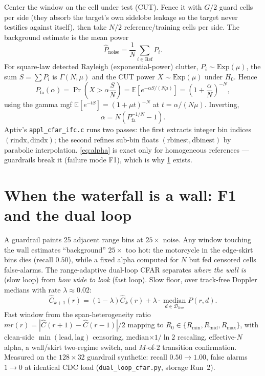 \documentclass[11pt,oneside]{book}
\begin{document}
Center the window on the cell under test (CUT). Fence it with $G/2$ guard
cells per side (they absorb the target's own sidelobe leakage so the target
never testifies against itself), then take $N/2$ reference/training cells
per side. The background estimate is the mean power
\begin{equation}
\hat{P}_{\mathrm{noise}} = \frac{1}{N}\sum_{i\in\mathrm{Ref}} P_i.
\label{eq:ca-est}
\end{equation}
For square-law detected Rayleigh (exponential-power) clutter, $P_i\sim
\mathrm{Exp}(\mu)$, the sum $S=\sum P_i$ is $\Gamma(N,\mu)$ and the CUT
power $X\sim\mathrm{Exp}(\mu)$ under $H_0$. Hence
\begin{equation}
P_{\mathrm{fa}}(\alpha)=\Pr\!\left(X>\alpha\frac{S}{N}\right)
= \mathbb{E}\!\left[e^{-\alpha S/(N\mu)}\right]
= \left(1+\frac{\alpha}{N}\right)^{-N},
\label{eq:pfa-deriv}
\end{equation}
using the gamma mgf $\mathbb{E}[e^{-tS}]=(1+\mu t)^{-N}$ at
$t=\alpha/(N\mu)$. Inverting,
\begin{equation}
\boxed{\alpha = N\left(P_{\mathrm{fa}}^{-1/N}-1\right).}
\label{eq:alpha}
\end{equation}
Aptiv's \texttt{appl\_cfar\_ifc.c} runs two passes: the first extracts
integer bin indices $(\mathrm{rindx},\mathrm{dindx})$; the second refines
sub-bin floats $(\mathrm{rbinest},\mathrm{dbinest})$ by parabolic
interpolation. \cref{eq:alpha} is exact only for homogeneous references ---
guardrails break it (failure mode F1), which is why \cref{sec:dual-loop}
exists.

\section{When the waterfall is a wall: F1 and the dual loop}
\label{sec:dual-loop}

A guardrail paints 25 adjacent range bins at $25\times$ noise. Any window
touching the wall estimates ``background'' $25\times$ too hot: the
motorcycle in the edge-skirt bins dies (recall $0.50$), while a fixed alpha
computed for $N$ but fed censored cells false-alarms. The range-adaptive
dual-loop CFAR separates \emph{where the wall is} (slow loop) from
\emph{how wide to look} (fast loop). Slow floor, over track-free Doppler
medians with rate $\lambda\approx0.02$:
\begin{equation}
\hat{C}_{k+1}(r)=(1-\lambda)\hat{C}_k(r)
+\lambda\cdot\operatorname*{median}_{d\in\mathcal{D}_{\mathrm{free}}}P(r,d).
\label{eq:slow-loop}
\end{equation}
Fast window from the span-heterogeneity ratio
$mr(r)=|\hat{C}(r+1)-\hat{C}(r-1)|/2$ mapping to
$R_0\in\{R_{\min},R_{\mathrm{mid}},R_{\max}\}$, with clean-side
$\min(\mathrm{lead},\mathrm{lag})$ censoring, median$\times1/\ln2$ rescaling,
effective-$N$ alpha, a wall/skirt two-regime switch, and $M$-of-$2$
transition confirmation. Measured on the $128\times32$ guardrail synthetic:
recall $0.50\to1.00$, false alarms $1\to0$ at identical CDC load
(\texttt{dual\_loop\_cfar.py}, storage Run~2).
\end{document}
